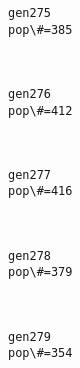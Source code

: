 \documentclass[11pt]{article}
\begin{document}
    \begin{Verbatim}[commandchars=\\\{\}]
gen275
pop\#=385

    \end{Verbatim}

    \begin{center}
    \end{center}
    { \hspace*{\fill} \\}
    
    \begin{Verbatim}[commandchars=\\\{\}]
gen276
pop\#=412

    \end{Verbatim}

    \begin{center}
    \end{center}
    { \hspace*{\fill} \\}
    
    \begin{Verbatim}[commandchars=\\\{\}]
gen277
pop\#=416

    \end{Verbatim}

    \begin{center}
    \end{center}
    { \hspace*{\fill} \\}
    
    \begin{Verbatim}[commandchars=\\\{\}]
gen278
pop\#=379

    \end{Verbatim}

    \begin{center}
    \end{center}
    { \hspace*{\fill} \\}
    
    \begin{Verbatim}[commandchars=\\\{\}]
gen279
pop\#=354

    \end{Verbatim}
\end{document}
